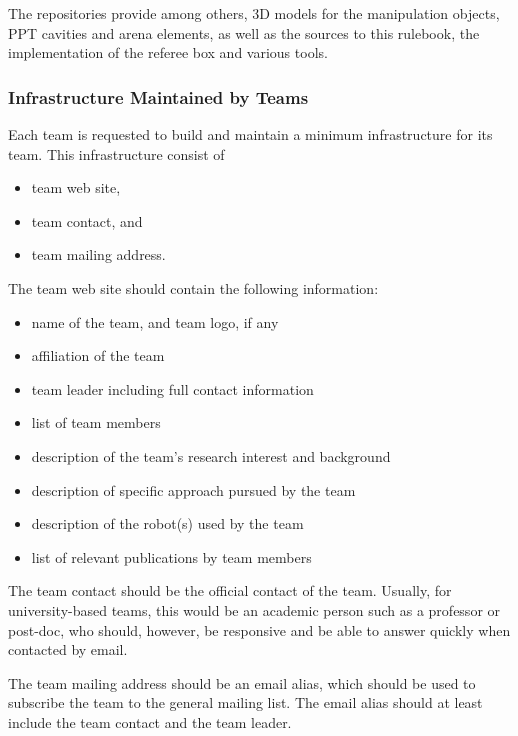 The repositories provide among others, 3D models for the manipulation objects, PPT cavities and arena elements, as well as the sources to this rulebook, the implementation of the referee box and various tools.


\subsubsection{Infrastructure Maintained by Teams}
Each team is requested to build and maintain a minimum infrastructure for its team. This infrastructure consist of 

\begin{itemize}
	\item team web site,
	\item team contact, and
	\item team mailing address.
\end{itemize}

The team web site should contain the following information:

\begin{itemize}
	\item name of the team, and team logo, if any
	\item affiliation of the team
	\item team leader including full contact information
	\item list of team members
	\item description of the team's research interest and background
	\item description of specific approach pursued by the team
	\item description of the robot(s) used by the team
	\item list of relevant publications by team members

\end{itemize}

The team contact should be the official contact of the team. Usually, for university-based teams, this would be an academic person such as a professor or post-doc, who should, however, be responsive and be able to answer quickly when contacted by email.
\par
The team mailing address should be an email alias, which should be used to subscribe the team to the general \RCAW mailing list. The email alias should at least include the team contact and the team leader.
